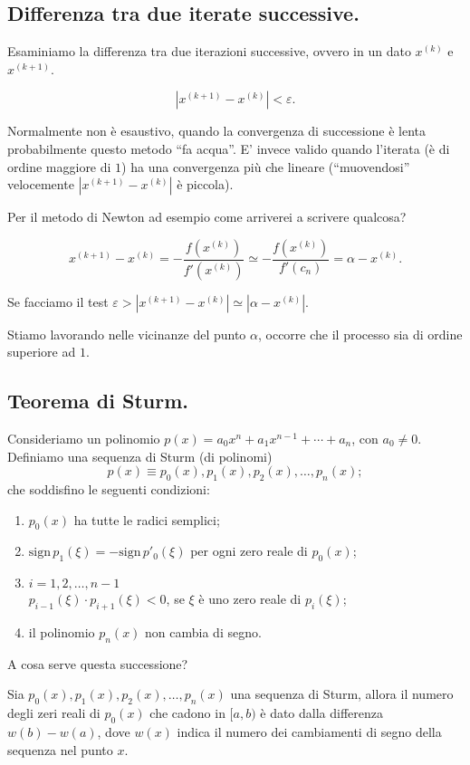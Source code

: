 \subsection{Differenza tra due iterate successive.}
Esaminiamo la differenza tra due iterazioni successive, ovvero in un dato
$x^{(k)}$ e $x^{(k+1)}$.

\[
|x^{(k+1)}-x^{(k)}| < \varepsilon.
\]

Normalmente non è esaustivo, quando la convergenza di successione è lenta
probabilmente questo metodo ``fa acqua''. E' invece valido quando l'iterata
(è di ordine maggiore di $1$) ha una convergenza più che lineare 
(``muovendosi'' velocemente $|x^{(k+1)}-x^{(k)}|$ è piccola).

Per il metodo di Newton ad esempio come arriverei a scrivere qualcosa?

\[
x^{(k+1)}-x^{(k)} = - \frac{f\left(x^{(k)}\right)}{f'\left(x^{(k)}\right)}
\simeq - \frac{f\left(x^{(k)}\right)}{f'\left(c_n\right)} = \alpha -x^{(k)}.
\]

Se facciamo il test $\varepsilon > |x^{(k+1)}-x^{(k)}| \simeq |\alpha -x^{(k)}|$.

Stiamo lavorando nelle vicinanze del punto $\alpha$, occorre che il processo 
sia di ordine superiore ad $1$.

\subsection{Teorema di Sturm.}
Consideriamo un polinomio $p(x) = a_0x^n + a_1x^{n-1}+ \cdots + a_n$, con 
$a_0 \neq 0$. Definiamo una sequenza di Sturm (di polinomi)
\[
p(x) \equiv p_0(x), p_1(x), p_2(x), \ldots, p_n(x);
\]
che soddisfino le seguenti condizioni:
\begin{enumerate}
\item $p_0(x)$ ha tutte le radici semplici;
\item $\textrm{sign}\,p_1(\xi) =- \textrm{sign}\, p'_0(\xi)$ per ogni zero 
reale di $p_0(x)$;
\item $i = 1,2, \ldots, n-1$\\

$p_{i-1}(\xi)\cdot p_{i+1}(\xi) < 0$, se $\xi$ è uno zero reale di $p_i(\xi)$;
\item il polinomio $p_n(x)$ non cambia di segno.
\end{enumerate}

A cosa serve questa successione?

\begin{teo}
Sia $p_0(x), p_1(x), p_2(x), \ldots, p_n(x)$ una sequenza di Sturm, allora
il numero degli zeri reali di $p_0(x)$ che cadono in $[a,b)$ è dato dalla 
differenza $w(b)-w(a)$, dove $w(x)$ indica il numero dei cambiamenti di
segno della sequenza nel punto $x$.
\end{teo}

